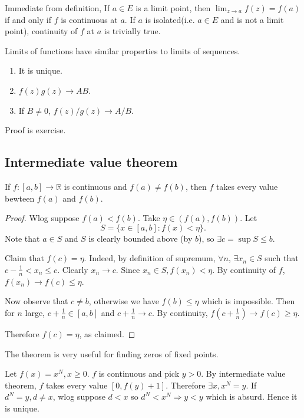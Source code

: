 \begin{remark}
    Immediate from definition, If $ a\in E $ is a limit point, then $ \lim_{z \to a} f(z)=f(a) $ if and only if $f$ is continuous at $a$. If $a$ is isolated(i.e. $a\in E$ and is not a limit point), continuity of $f$ at $a$ is trivially true.
\end{remark}

\begin{sprop}
    Limits of functions have similar properties to limits of sequences.
    \begin{enumerate}
        \item It is unique.
        \item $f(z)g(z)\to AB$.
        \item If $B\neq 0$, $ f(z)/g(z)\to A/B $.
    \end{enumerate}
\end{sprop}
Proof is exercise.

\subsection{Intermediate value theorem}
\begin{theorem}\label{thm:intermediate value theorem}
    If $ f:[a,b]\to \mathbb{R}  $ is continuous and $ f(a)\neq f(b) $, then $f$ takes every value bewteen $f(a)$ and $f(b)$.
\end{theorem}
\begin{proof}
    Wlog suppose $ f(a)<f(b) $. Take $ \eta\in (f(a),f(b)) $. Let 
    \[
        S = \{x\in [a,b]:f(x)<\eta \}.
    \]
    Note that $a\in S$ and $S$ is clearly bounded above (by $b$), so $ \exists c = \sup S\le b $. 
    
    Claim that $f(c)=\eta$. Indeed, by definition of supremum, $ \forall n $, $ \exists x_n\in S$ such that $ c-\frac{1}{n}<x_n\le c $. Clearly $x_n\to c$. Since $ x_n\in S, f(x_n)<\eta $. By continuity of $f$, $f(x_n)\to f(c)\le \eta$. 

    Now observe that $ c\neq b $, otherwise we have $ f(b)\le \eta $ which is impossible. Then for $n$ large, $ c+\frac{1}{n}\in [a,b] $ and $ c+\frac{1}{n}\to c $. By continuity, $ f(c+\frac{1}{n})\to f(c)\ge \eta $.

    Therefore $ f(c)=\eta $, as claimed.
\end{proof}
\begin{remark}
    The theorem is very useful for finding zeros of fixed points.
\end{remark}

\begin{example}
    Let $ f(x)=x^N, x\ge 0 $. $f$ is continuous and pick $y>0$. By intermediate value theorem, $f$ takes every value $ [0,f(y)+1] $. Therefore $ \exists x, x^N=y $. If $ d^N=y,d\neq x $, wlog suppose $d<x$ so $ d^N<x^N \Rightarrow y<y $ which is absurd. Hence it is unique. 
\end{example}